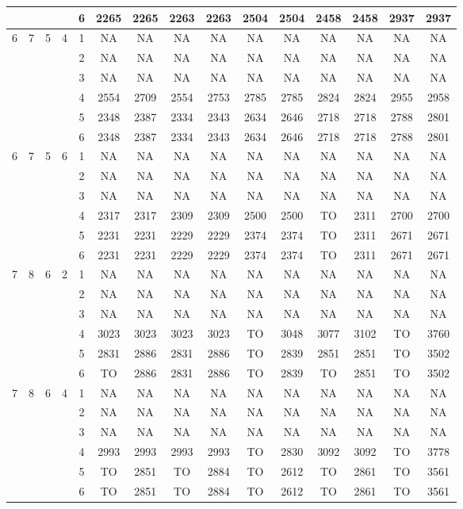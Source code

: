 \begin{longtable}{|c|c|c|c|c|c c|c c|c c|c c|c c|}
 & & & & 6 & 2265 & 2265 & 2263 & 2263 & 2504 & 2504 & 2458 & 2458 & 2937 & 2937 \\
\hline
\multirow{6}{*}{6} & \multirow{6}{*}{7} & \multirow{6}{*}{5} & \multirow{6}{*}{4} & 1 & NA & NA & NA & NA & NA & NA & NA & NA & NA & NA \\
 & & & & 2 & NA & NA & NA & NA & NA & NA & NA & NA & NA & NA \\
 & & & & 3 & NA & NA & NA & NA & NA & NA & NA & NA & NA & NA \\
 & & & & 4 & 2554 & 2709 & 2554 & 2753 & 2785 & 2785 & 2824 & 2824 & 2955 & 2958 \\
 & & & & 5 & 2348 & 2387 & 2334 & 2343 & 2634 & 2646 & 2718 & 2718 & 2788 & 2801 \\
 & & & & 6 & 2348 & 2387 & 2334 & 2343 & 2634 & 2646 & 2718 & 2718 & 2788 & 2801 \\
\hline
\multirow{6}{*}{6} & \multirow{6}{*}{7} & \multirow{6}{*}{5} & \multirow{6}{*}{6} & 1 & NA & NA & NA & NA & NA & NA & NA & NA & NA & NA \\
 & & & & 2 & NA & NA & NA & NA & NA & NA & NA & NA & NA & NA \\
 & & & & 3 & NA & NA & NA & NA & NA & NA & NA & NA & NA & NA \\
 & & & & 4 & 2317 & 2317 & 2309 & 2309 & 2500 & 2500 & TO & 2311 & 2700 & 2700 \\
 & & & & 5 & 2231 & 2231 & 2229 & 2229 & 2374 & 2374 & TO & 2311 & 2671 & 2671 \\
 & & & & 6 & 2231 & 2231 & 2229 & 2229 & 2374 & 2374 & TO & 2311 & 2671 & 2671 \\
\hline
\multirow{6}{*}{7} & \multirow{6}{*}{8} & \multirow{6}{*}{6} & \multirow{6}{*}{2} & 1 & NA & NA & NA & NA & NA & NA & NA & NA & NA & NA \\
 & & & & 2 & NA & NA & NA & NA & NA & NA & NA & NA & NA & NA \\
 & & & & 3 & NA & NA & NA & NA & NA & NA & NA & NA & NA & NA \\
 & & & & 4 & 3023 & 3023 & 3023 & 3023 & TO & 3048 & 3077 & 3102 & TO & 3760 \\
 & & & & 5 & 2831 & 2886 & 2831 & 2886 & TO & 2839 & 2851 & 2851 & TO & 3502 \\
 & & & & 6 & TO & 2886 & 2831 & 2886 & TO & 2839 & TO & 2851 & TO & 3502 \\
\hline
\multirow{6}{*}{7} & \multirow{6}{*}{8} & \multirow{6}{*}{6} & \multirow{6}{*}{4} & 1 & NA & NA & NA & NA & NA & NA & NA & NA & NA & NA \\
 & & & & 2 & NA & NA & NA & NA & NA & NA & NA & NA & NA & NA \\
 & & & & 3 & NA & NA & NA & NA & NA & NA & NA & NA & NA & NA \\
 & & & & 4 & 2993 & 2993 & 2993 & 2993 & TO & 2830 & 3092 & 3092 & TO & 3778 \\
 & & & & 5 & TO & 2851 & TO & 2884 & TO & 2612 & TO & 2861 & TO & 3561 \\
 & & & & 6 & TO & 2851 & TO & 2884 & TO & 2612 & TO & 2861 & TO & 3561 \\
\hline
\end{longtable}